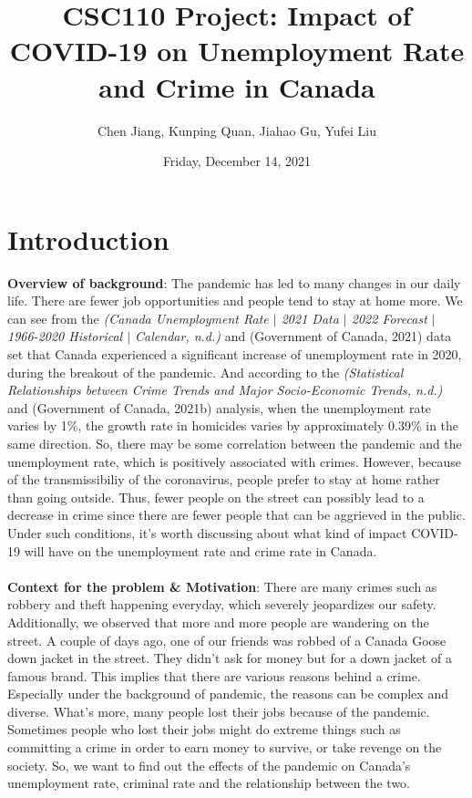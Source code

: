 \documentclass[fontsize=11pt]{article}
\title{CSC110 Project: Impact of COVID-19 on Unemployment Rate and Crime in Canada}
\author{Chen Jiang, Kunping Quan, Jiahao Gu, Yufei Liu}
\date{Friday, December 14, 2021}
\begin{document}
\maketitle

\section*{Introduction}
\textbf{Overview of background}: The pandemic has led to many changes in our daily life. There are fewer job opportunities and people tend to stay at home more. We can see from the \emph{(Canada Unemployment Rate $|$ 2021 Data $|$ 2022 Forecast $|$ 1966-2020 Historical $|$ Calendar, n.d.)} and (Government of Canada, 2021) data set that Canada experienced a significant increase of unemployment rate in 2020, during the breakout of the pandemic. And according to the \emph{(Statistical Relationships between Crime Trends and Major Socio-Economic Trends, n.d.)} and (Government of Canada, 2021b) analysis, when the unemployment rate varies by 1\%, the growth rate in homicides varies by approximately 0.39\% in the same direction. So, there may be some correlation between the pandemic and the unemployment rate, which is positively associated with crimes. However, because of the transmissibiliy of the coronavirus, people prefer to stay at home rather than going outside. Thus, fewer people on the street can possibly lead to a decrease in crime since there are fewer people that can be aggrieved in the public. Under such conditions, it's worth discussing about what kind of impact COVID-19 will have on the unemployment rate and crime rate in Canada.
\\
\hspace*{\fill}\\
\textbf{Context for the problem \& Motivation}: There are many crimes such as robbery and theft happening everyday, which severely jeopardizes our safety. Additionally, we observed that more and more people are wandering on the street. A couple of days ago, one of our friends was robbed of a Canada Goose down jacket in the street. They didn't ask for money but for a down jacket of a famous brand. This implies that there are various reasons behind a crime. Especially under the background of pandemic, the reasons can be complex and diverse. What's more, many people lost their jobs because of the pandemic. Sometimes people who lost their jobs might do extreme things such as committing a crime in order to earn money to survive, or take revenge on the society. So, we want to find out the effects of the pandemic on Canada's unemployment rate, criminal rate and the relationship between the two.
\end{document}
